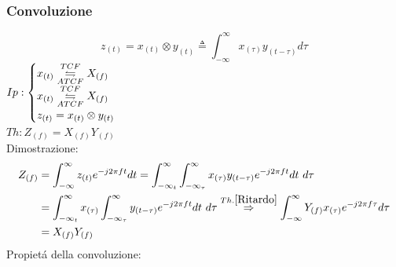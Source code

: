         \subsubsection{Convoluzione}\label{Convoluzione}
            \[
                z_{(t)} = x_{(t)} \otimes  y_{(t)} \triangleq \int_{-\infty}^{\infty} x_{(\tau)}y_{(t-\tau)} d\tau
            \] 
            $Ip:\begin{cases}
                x_{(t)}\overunderset{TCF}{ATCF}{\leftrightharpoons} X_{(f)} \\
                x_{(t)}\overunderset{TCF}{ATCF}{\leftrightharpoons} X_{(f)} \\
                z_{(t)} = x_{(t)} \otimes  y_{(t)}   
            \end{cases}$\\
            $Th: Z_{(f)} = X_{(f)}Y_{(f)} $ \\
            Dimostrazione:
                \begin{align}
                    Z_{(f)} &= \int_{-\infty}^{\infty} z_{(t)} e^{-j2\pi ft} dt = \int_{-\infty_{t}}^{\infty}\int_{-\infty_{\tau}}^{\infty} x_{(\tau)}y_{(t-\tau)} e^{-j2\pi ft} dt\ d\tau \nonumber \\
                            &= \int_{-\infty_{t}}^{\infty}x_{(\tau)}\int_{-\infty_{\tau}}^{\infty} y_{(t-\tau)}e^{-j2\pi ft}  dt\ d\tau \overset{Th. \ref{Ritardo}}{\Rightarrow} \int_{-\infty}^{\infty}Y_{(f)}x_{(\tau)}e^{-j2\pi f\tau} d\tau  \nonumber \\
                            &= X_{(f)}Y_{(f)} \nonumber
                \end{align}
            Propietá della convoluzione:
